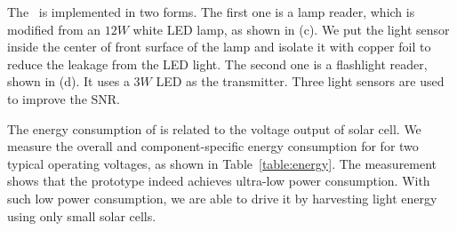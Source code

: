 The \reader\ is implemented in two forms. The first one is a lamp reader, which is modified from an $12W$ white LED lamp, as shown in (c). We put the light sensor inside the center of front surface of the lamp and isolate it with copper foil to reduce the leakage from the LED light. The second one is a flashlight reader, shown in (d). It uses a $3W$ LED as the transmitter. Three light sensors are used to improve the SNR. %


The energy consumption of \vitag is related to the voltage output of solar cell. We measure the overall and component-specific energy consumption for \vitag for two typical operating voltages, as shown in Table~\ref{table:energy}. The measurement shows that the \vitag prototype indeed achieves ultra-low power consumption. With such low power consumption, we are able to drive it by harvesting light energy using only small solar cells.








